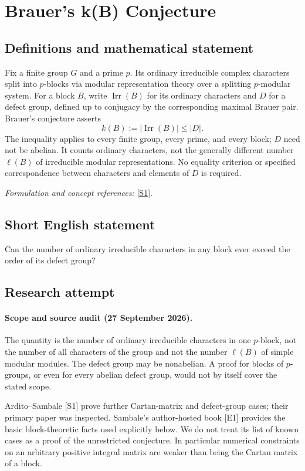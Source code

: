 \documentclass[11pt]{article}
\begin{document}
\section*{\texorpdfstring{Brauer's k(B) Conjecture}{Brauer's k(B) Conjecture}}\label{30006878}
\subsection{Definitions and mathematical statement}
Fix a finite group $G$ and a prime $p$. Its ordinary irreducible complex characters split into $p$-blocks via modular representation theory over a splitting $p$-modular system. For a block $B$, write $\operatorname{Irr}(B)$ for its ordinary characters and $D$ for a defect group, defined up to conjugacy by the corresponding maximal Brauer pair. Brauer's conjecture asserts
\[
 k(B):=|\operatorname{Irr}(B)|\le |D|.
\]
The inequality applies to every finite group, every prime, and every block; $D$ need not be abelian. It counts ordinary characters, not the generally different number $\ell(B)$ of irreducible modular representations. No equality criterion or specified correspondence between characters and elements of $D$ is required.
\par\smallskip\textit{Formulation and concept references:} \href{https://arxiv.org/pdf/1911.10710}{[S1]}.

\subsection{Short English statement}
Can the number of ordinary irreducible characters in any block ever exceed the order of its defect group?
\subsection{Research attempt}
\paragraph{Scope and source audit (27 September 2026).}
The quantity is the number of ordinary irreducible characters in one
$p$-block, not the number of all characters of the group and not the
number $\ell(B)$ of simple modular modules. The defect group may be
nonabelian. A proof for blocks of $p$-groups, or even for every abelian
defect group, would not by itself cover the stated scope.

Ardito--Sambale [S1] prove further Cartan-matrix and defect-group cases;
their primary paper was inspected. Sambale's author-hosted book [E1]
provides the basic block-theoretic facts used explicitly below. We do
not treat its list of known cases as a proof of the unrestricted
conjecture. In particular numerical constraints on an arbitrary positive
integral matrix are weaker than being the Cartan matrix of a block.
\end{document}
